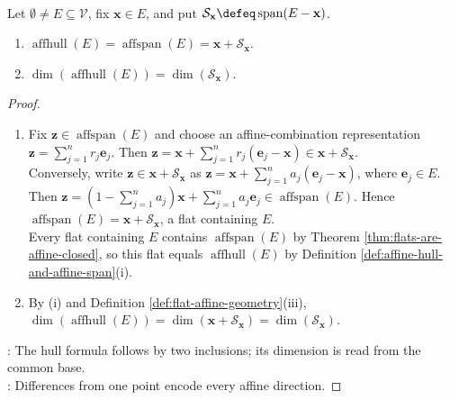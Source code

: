 \begin{theorem} \label{thm:affine-hull-span-formula} \\
Let $\emptyset\neq E\subseteq\mathcal{V}$, fix $\mathbf{x}\in E$, and put $\mathcal{S}_{\mathbf{x}}\defeq\operatorname{span}(E-\mathbf{x})$.
\begin{enumerate}[label=(\roman*)]
\setlength{\itemsep}{0pt}
\item $\operatorname{affhull}(E)=\operatorname{affspan}(E)=\mathbf{x}+\mathcal{S}_{\mathbf{x}}$.
\item $\dim(\operatorname{affhull}(E))=\dim(\mathcal{S}_{\mathbf{x}})$.
\end{enumerate}
\begin{proof}
\begin{enumerate}[label=(\roman*)]
\setlength{\itemsep}{0pt}
\item Fix $\mathbf{z}\in\operatorname{affspan}(E)$ and choose an affine-combination representation $\mathbf{z}=\sum\limits_{j=1}^n r_j\mathbf{e}_j$. Then $\mathbf{z}=\mathbf{x}+\sum\limits_{j=1}^n r_j(\mathbf{e}_j-\mathbf{x})\in\mathbf{x}+\mathcal{S}_{\mathbf{x}}$.\\
Conversely, write $\mathbf{z}\in\mathbf{x}+\mathcal{S}_{\mathbf{x}}$ as $\mathbf{z}=\mathbf{x}+\sum\limits_{j=1}^n a_j(\mathbf{e}_j-\mathbf{x})$, where $\mathbf{e}_j\in E$.\\
Then $\mathbf{z}=(1-\sum\limits_{j=1}^n a_j)\mathbf{x}+\sum\limits_{j=1}^n a_j\mathbf{e}_j\in\operatorname{affspan}(E)$. Hence $\operatorname{affspan}(E)=\mathbf{x}+\mathcal{S}_{\mathbf{x}}$, a flat containing $E$.\\
Every flat containing $E$ contains $\operatorname{affspan}(E)$ by Theorem \ref{thm:flats-are-affine-closed}, so this flat equals $\operatorname{affhull}(E)$ by Definition \ref{def:affine-hull-and-affine-span}(i).
\item By (i) and Definition \ref{def:flat-affine-geometry}(iii), $\dim(\operatorname{affhull}(E))=\dim(\mathbf{x}+\mathcal{S}_{\mathbf{x}})=\dim(\mathcal{S}_{\mathbf{x}})$.
\end{enumerate}
: The hull formula follows by two inclusions; its dimension is read from the common base.\\
: Differences from one point encode every affine direction.
\end{proof}
\end{theorem}

